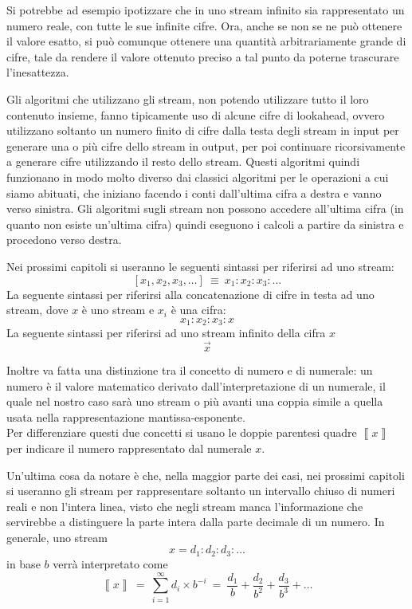\documentclass[Lau]{sapthesis}
\begin{document}
Si potrebbe ad esempio ipotizzare che in uno stream infinito sia rappresentato 
un numero reale, con tutte le sue infinite cifre. Ora, anche se non se ne può 
ottenere il valore esatto, si può comunque ottenere una quantità arbitrariamente 
grande di cifre, tale da rendere il valore ottenuto preciso a tal punto da 
poterne trascurare l'inesattezza.

Gli algoritmi che utilizzano gli stream, non potendo utilizzare tutto il loro 
contenuto insieme, fanno tipicamente uso di alcune cifre di lookahead, ovvero 
utilizzano soltanto un numero finito di cifre dalla testa degli stream in input 
per generare una o più cifre dello stream in output, per poi continuare 
ricorsivamente a generare cifre utilizzando il resto dello stream. Questi 
algoritmi quindi funzionano in modo molto diverso dai classici algoritmi per le 
operazioni a cui siamo abituati, che iniziano facendo i conti dall'ultima cifra 
a destra e vanno verso sinistra. Gli algoritmi sugli stream non possono accedere 
all'ultima cifra (in quanto non esiste un'ultima cifra) quindi eseguono i 
calcoli a partire da sinistra e procedono verso destra.

\medskip

Nei prossimi capitoli si useranno le seguenti sintassi per riferirsi ad uno 
stream:
$$\left[x_1, x_2, x_3,\ldots\right]\ \equiv\ x_1:x_2:x_3:\ldots$$
La seguente sintassi per riferirsi alla concatenazione di cifre in testa ad uno 
stream, dove $x$ è uno stream e $x_i$ è una cifra:
$$x_1:x_2:x_3:x$$
La seguente sintassi per riferirsi ad uno stream infinito della cifra $x$
$$\overrightarrow{x}$$

Inoltre va fatta una distinzione tra il concetto di numero e di numerale: un 
numero è il valore matematico derivato dall'interpretazione di un numerale, il 
quale nel nostro caso sarà uno stream o più avanti una coppia simile a quella 
usata nella rappresentazione mantissa-esponente.\\
Per differenziare questi due concetti si usano le doppie parentesi quadre 
$\left\llbracket x\right\rrbracket$ per indicare il numero rappresentato dal 
numerale 
$x$.

\medskip

Un'ultima cosa da notare è che, nella maggior parte dei casi, nei prossimi 
capitoli si useranno gli stream per rappresentare soltanto un intervallo chiuso 
di numeri reali e non l'intera linea, visto che negli stream manca 
l'informazione che servirebbe a distinguere la parte intera dalla parte decimale 
di un numero. In generale, uno stream
$$x=d_1:d_2:d_3:\ldots$$
in base $b$ verrà interpretato come
$$\left\llbracket x\right\rrbracket\ =\ \sum_{i=1}^{\infty} d_i \times b^{-i}\ =\ 
\frac{d_1}{b}+\frac{d_2}{b^2}+\frac{d_3}{b^3}+\ldots$$
\end{document}
